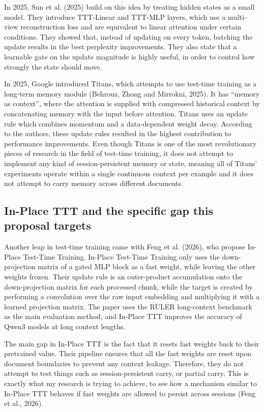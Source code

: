 \documentclass[12pt,a4paper]{article}
\begin{document}
In 2025, Sun et al. (2025) build on this idea by treating hidden states as a small model. They introduce TTT-Linear and TTT-MLP layers, which use a multi-view reconstruction loss and are equivalent to linear attention under certain conditions. They showed that, instead of updating on every token, batching the update results in the best perplexity improvements. They also state that a learnable gate on the update magnitude is highly useful, in order to control how strongly the state should move.

In 2025, Google introduced Titans, which attempts to use test-time training as a long-term memory module (Behrouz, Zhong and Mirrokni, 2025). It has ``memory as context'', where the attention is supplied with compressed historical context by concatenating memory with the input before attention. Titans uses an update rule which combines momentum and a data-dependent weight decay. According to the authors, these update rules resulted in the highest contribution to performance improvements. Even though Titans is one of the most revolutionary pieces of research in the field of test-time training, it does not attempt to implement any kind of session-persistent memory or state, meaning all of Titans' experiments operate within a single continuous context per example and it does not attempt to carry memory across different documents.

\subsection*{In-Place TTT and the specific gap this proposal targets}

Another leap in test-time training came with Feng et al. (2026), who propose In-Place Test-Time Training. In-Place Test-Time Training only uses the down-projection matrix of a gated MLP block as a fast weight, while leaving the other weights frozen. Their update rule is an outer-product accumulation onto the down-projection matrix for each processed chunk, while the target is created by performing a convolution over the raw input embedding and multiplying it with a learned projection matrix. The paper uses the RULER long-context benchmark as the main evaluation method, and In-Place TTT improves the accuracy of Qwen3 models at long context lengths.

The main gap in In-Place TTT is the fact that it resets fast weights back to their pretrained value. Their pipeline ensures that all the fast weights are reset upon document boundaries to prevent any context leakage. Therefore, they do not attempt to test things such as session-persistent carry, or partial carry. This is exactly what my research is trying to achieve, to see how a mechanism similar to In-Place TTT behaves if fast weights are allowed to persist across sessions (Feng et al., 2026).
\end{document}
